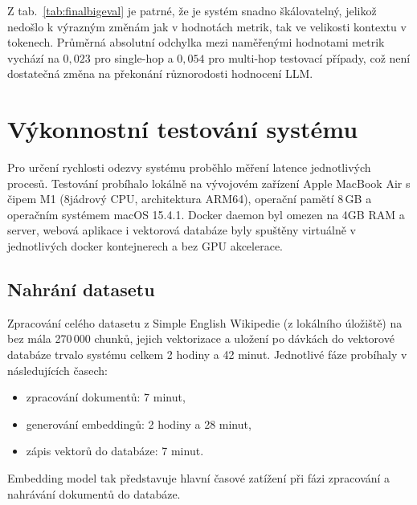 Z tab.~\ref{tab:finalbigeval} je patrné, že je systém snadno škálovatelný, jelikož nedošlo k výrazným změnám jak v hodnotách metrik, tak ve velikosti kontextu v tokenech. Průměrná absolutní odchylka mezi naměřenými hodnotami metrik vychází na $0{,}023$ pro single-hop a $0{,}054$ pro multi-hop testovací případy, což není dostatečná změna na překonání různorodosti hodnocení LLM.

\section{Výkonnostní testování systému}
Pro určení rychlosti odezvy systému proběhlo měření latence jednotlivých procesů. Testování probíhalo lokálně na vývojovém zařízení Apple MacBook Air s čipem M1 (8jádrový CPU, architektura ARM64), operační pamětí 8\,GB a operačním systémem macOS 15.4.1. Docker daemon byl omezen na 4GB RAM a server, webová aplikace i vektorová databáze byly spuštěny virtuálně v jednotlivých docker kontejnerech a bez GPU akcelerace.

\subsection{Nahrání datasetu}
Zpracování celého datasetu z Simple English Wikipedie (z lokálního úložiště) na bez mála 270\,000 chunků, jejich vektorizace a uložení po dávkách do vektorové databáze trvalo systému celkem 2 hodiny a 42 minut. Jednotlivé fáze probíhaly v následujících časech:
\begin{itemize}
    \item zpracování dokumentů: 7 minut,
    \item generování embeddingů: 2 hodiny a 28 minut,
    \item zápis vektorů do databáze: 7 minut.
\end{itemize}
Embedding model tak představuje hlavní časové zatížení při fázi zpracování a nahrávání dokumentů do databáze.

\newpage

